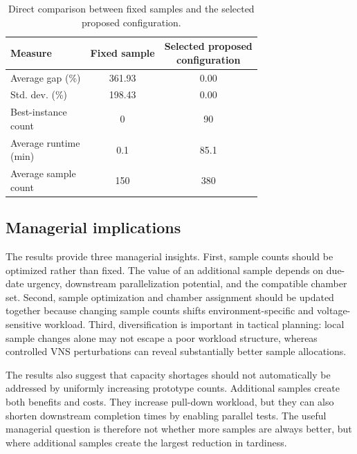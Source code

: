 \documentclass[11pt]{article}
\begin{document}
\begin{table}[H]
\centering
\caption{Direct comparison between fixed samples and the selected proposed configuration.}
\label{tab:fixed_selected_sample_comparison_short}
\begin{tabular}{lcc}
\hline
\textbf{Measure}
& \textbf{Fixed sample}
& \shortstack{\textbf{Selected proposed}\\\textbf{configuration}} \\
\hline
Average gap (\%) & 361.93 & 0.00 \\
Std. dev. (\%) & 198.43 & 0.00 \\
\shortstack[l]{Best-instance\\count} & 0 & 90 \\
\shortstack[l]{Average runtime\\(min)} & 0.1 & 85.1 \\
\shortstack[l]{Average sample\\count} & 150 & 380 \\
\hline
\end{tabular}
\end{table}

\subsection{Managerial implications}
\label{subsec:managerial}

The results provide three managerial insights. First, sample counts should be optimized rather than fixed. The value of an additional sample depends on due-date urgency, downstream parallelization potential, and the compatible chamber set. Second, sample optimization and chamber assignment should be updated together because changing sample counts shifts environment-specific and voltage-sensitive workload. Third, diversification is important in tactical planning: local sample changes alone may not escape a poor workload structure, whereas controlled VNS perturbations can reveal substantially better sample allocations.

The results also suggest that capacity shortages should not automatically be addressed by uniformly increasing prototype counts. Additional samples create both benefits and costs. They increase pull-down workload, but they can also shorten downstream completion times by enabling parallel tests. The useful managerial question is therefore not whether more samples are always better, but where additional samples create the largest reduction in tardiness.
\end{document}
